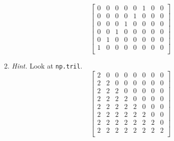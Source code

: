 \documentclass{article}
\theoremstyle{remark}
\begin{document}
\begin{enumerate}
\begin{displaymath}
\begin{bmatrix}
      0 & 0 & 0 & 0 & 0 & 1 & 0 & 0 \\
      0 & 0 & 0 & 0 & 1 & 0 & 0 & 0 \\
      0 & 0 & 0 & 1 & 0 & 0 & 0 & 0 \\
      0 & 0 & 1 & 0 & 0 & 0 & 0 & 0 \\
      0 & 1 & 0 & 0 & 0 & 0 & 0 & 0 \\
      1 & 0 & 0 & 0 & 0 & 0 & 0 & 0 \\
    \end{bmatrix}
  \end{displaymath}
\item \textit{Hint.} Look at \texttt{np.tril}.
  \begin{displaymath}
    \begin{bmatrix}
      2 & 0 & 0 & 0 & 0 & 0 & 0 & 0 \\
      2 & 2 & 0 & 0 & 0 & 0 & 0 & 0 \\
      2 & 2 & 2 & 0 & 0 & 0 & 0 & 0 \\
      2 & 2 & 2 & 2 & 0 & 0 & 0 & 0 \\
      2 & 2 & 2 & 2 & 2 & 0 & 0 & 0 \\
      2 & 2 & 2 & 2 & 2 & 2 & 0 & 0 \\
      2 & 2 & 2 & 2 & 2 & 2 & 2 & 0 \\
      2 & 2 & 2 & 2 & 2 & 2 & 2 & 2 \\
    \end{bmatrix}
  \end{displaymath}
\end{enumerate}
\end{document}
